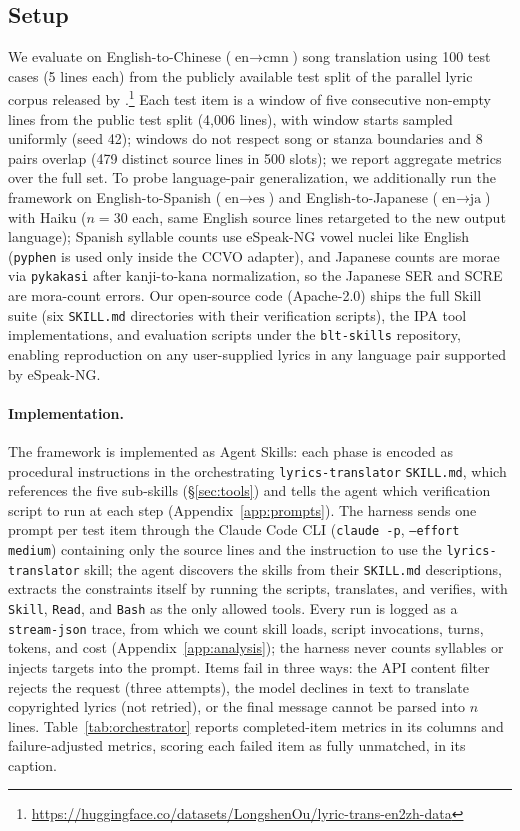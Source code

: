 \documentclass[11pt]{article}
\begin{document}
\subsection{Setup}

We evaluate on English-to-Chinese ($\text{en} \rightarrow \text{cmn}$) song translation using 100 test cases (5 lines each) from the publicly available test split of the parallel lyric corpus released by \citet{ou-etal-2023-songs}.\footnote{\url{https://huggingface.co/datasets/LongshenOu/lyric-trans-en2zh-data}}
Each test item is a window of five consecutive non-empty lines from the public test split (4{,}006 lines), with window starts sampled uniformly (seed 42); windows do not respect song or stanza boundaries and 8 pairs overlap (479 distinct source lines in 500 slots); we report aggregate metrics over the full set.
To probe language-pair generalization, we additionally run the framework on English-to-Spanish ($\text{en} \rightarrow \text{es}$) and English-to-Japanese ($\text{en} \rightarrow \text{ja}$) with Haiku ($n{=}30$ each, same English source lines retargeted to the new output language); Spanish syllable counts use eSpeak-NG vowel nuclei like English (\texttt{pyphen} is used only inside the CCVO adapter), and Japanese counts are morae via \texttt{pykakasi} after kanji-to-kana normalization, so the Japanese SER and SCRE are mora-count errors.
Our open-source code (Apache-2.0) ships the full Skill suite (six \texttt{SKILL.md} directories with their verification scripts), the IPA tool implementations, and evaluation scripts under the \texttt{blt-skills} repository, enabling reproduction on any user-supplied lyrics in any language pair supported by eSpeak-NG.

\paragraph{Implementation.}
The framework is implemented as Agent Skills: each phase is encoded as procedural instructions in the orchestrating \texttt{lyrics-translator} \texttt{SKILL.md}, which references the five sub-skills (\S\ref{sec:tools}) and tells the agent which verification script to run at each step (Appendix~\ref{app:prompts}).
The harness sends one prompt per test item through the Claude Code CLI (\texttt{claude -p}, \texttt{--effort medium}) containing only the source lines and the instruction to use the \texttt{lyrics-translator} skill; the agent discovers the skills from their \texttt{SKILL.md} descriptions, extracts the constraints itself by running the scripts, translates, and verifies, with \texttt{Skill}, \texttt{Read}, and \texttt{Bash} as the only allowed tools.
Every run is logged as a \texttt{stream-json} trace, from which we count skill loads, script invocations, turns, tokens, and cost (Appendix~\ref{app:analysis}); the harness never counts syllables or injects targets into the prompt.
Items fail in three ways: the API content filter rejects the request (three attempts), the model declines in text to translate copyrighted lyrics (not retried), or the final message cannot be parsed into $n$ lines. Table~\ref{tab:orchestrator} reports completed-item metrics in its columns and failure-adjusted metrics, scoring each failed item as fully unmatched, in its caption.
\end{document}
